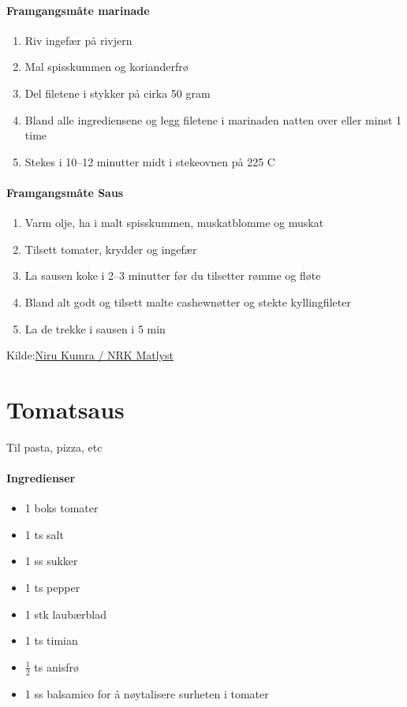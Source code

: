 \documentclass[12pt,a4paper]{book}
\begin{document}
\paragraph{Framgangsmåte marinade}
\begin{enumerate}[noitemsep]
	\item Riv ingefær på rivjern 
	\item Mal spisskummen og korianderfrø
	\item Del filetene i stykker på cirka 50 gram
	\item Bland alle ingrediensene og legg filetene i marinaden natten over eller minst 1 time
	\item Stekes i 10--12 minutter midt i stekeovnen på 225 \degree C
\end{enumerate}

\paragraph{Framgangsmåte Saus}
\begin{enumerate}[noitemsep]
	\item Varm olje, ha i malt spisskummen, muskatblomme og muskat
	\item Tilsett tomater, krydder og ingefær
	\item La sausen koke i 2--3 minutter før du tilsetter rømme og fløte
	\item Bland alt godt og tilsett malte cashewnøtter og stekte kyllingfileter
	\item La de trekke i sausen i 5 min
\end{enumerate}


Kilde:\href{https://www.nrk.no/mat/nirus-chicken-tikka-masala-1.7314334}{Niru Kumra / NRK Matlyst}
\clearpage{}
\clearpage{}\section{﻿Tomatsaus}
Til pasta, pizza, etc

\paragraph{Ingredienser}
\begin{itemize}[noitemsep]
	\item 1 boks tomater
	\item 1 ts salt
	\item 1 ss sukker
	\item 1 ts pepper
	\item 1 stk laubærblad
	\item 1 ts timian
	\item $\frac{1}{2}$ ts anisfrø
	\item 1 ss balsamico for å nøytalisere surheten i tomater
\end{itemize}
\end{document}

